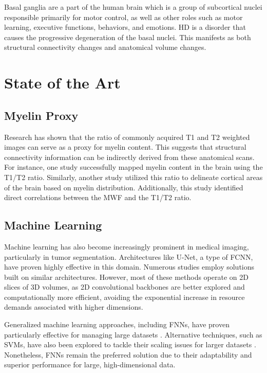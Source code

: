 Basal ganglia are a part of the human brain which is a group of subcortical nuclei responsible primarily for motor control, as well as other roles such as motor learning, executive functions, behaviors, and emotions. \cite{basal} \ac{HD} is a disorder that causes the progressive degeneration of the basal nuclei. \cite{hunting} This manifests as both structural connectivity changes and anatomical volume changes. \cite{basal2}\par

\section{State of the Art}
\label{sec:stateoftheart}

\subsection{Myelin Proxy}

Research has shown that the ratio of commonly acquired T1 and T2 weighted images can serve as a proxy for myelin content. This suggests that structural connectivity information can be indirectly derived from these anatomical scans. For instance, one study \cite{myelin2} successfully mapped myelin content in the brain using the T1/T2 ratio. Similarly, another study \cite{myelin1} utilized this ratio to delineate cortical areas of the brain based on myelin distribution. Additionally, this study \cite{myelin3} identified direct correlations between the \ac{MWF} and the T1/T2 ratio.

\subsection{Machine Learning}

Machine learning has also become increasingly prominent in medical imaging, particularly in tumor segmentation. Architectures like U-Net, a type of \ac{FCNN}, have proven highly effective in this domain. Numerous studies \cite{unetseg} \cite{unetseg2} \cite{unetseg3} \cite{unetseg4} \cite{unetseg5} employ solutions built on similar architectures. However, most of these methods operate on 2D slices of 3D volumes, as 2D convolutional backbones are better explored and computationally more efficient, avoiding the exponential increase in resource demands associated with higher dimensions.\par
Generalized machine learning approaches, including \ac{FNN}s, have proven particularly effective for managing large datasets \cite{fnn1}. Alternative techniques, such as \ac{SVM}s, have also been explored to tackle their scaling issues for larger datasets \cite{svm1} \cite{svm2}. Nonetheless, \ac{FNN}s remain the preferred solution due to their adaptability and superior performance for large, high-dimensional data.

